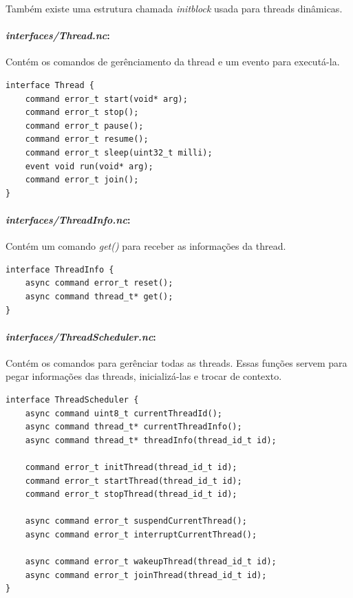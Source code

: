 \documentclass[a4paper, 10pt]{article}
\begin{document}
Também existe uma estrutura chamada \textit{initblock} usada para threads dinâmicas.

\paragraph{\textit{interfaces/Thread.nc}:} Contém os comandos de gerênciamento da thread e um evento para executá-la.
\begin{lstlisting}
interface Thread {
    command error_t start(void* arg);
    command error_t stop();
    command error_t pause();
    command error_t resume();
    command error_t sleep(uint32_t milli);
    event void run(void* arg);
    command error_t join();
}  
\end{lstlisting}

\paragraph{\textit{interfaces/ThreadInfo.nc}:} Contém um comando \textit{get()} para receber as informações da thread.
\begin{lstlisting}
interface ThreadInfo {
    async command error_t reset();
    async command thread_t* get();
} 
\end{lstlisting}

\paragraph{\textit{interfaces/ThreadScheduler.nc}:} Contém os comandos para gerênciar todas as threads. Essas funções
servem para pegar informações das threads, inicializá-las e trocar de contexto.
\begin{lstlisting}
interface ThreadScheduler {
    async command uint8_t currentThreadId();
    async command thread_t* currentThreadInfo();
    async command thread_t* threadInfo(thread_id_t id);

    command error_t initThread(thread_id_t id);
    command error_t startThread(thread_id_t id);
    command error_t stopThread(thread_id_t id);

    async command error_t suspendCurrentThread();
    async command error_t interruptCurrentThread();

    async command error_t wakeupThread(thread_id_t id);
    async command error_t joinThread(thread_id_t id);
}
\end{lstlisting}
\end{document}
